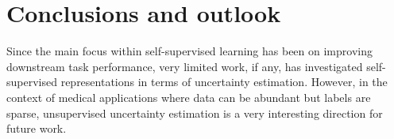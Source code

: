 
\chapter[conclusions and outlook]{Conclusions and outlook}\label{chp:conclusion}


Since the main focus within self-supervised learning has been on improving downstream task performance, very limited work, if any, has investigated self-supervised representations in terms of uncertainty estimation. 
However, in the context of medical applications where data can be abundant but labels are sparse, unsupervised uncertainty estimation is a very interesting direction for future work.


